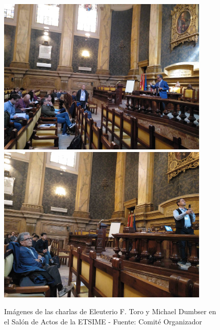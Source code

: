 \documentclass[twoside]{article}
\begin{document}
\begin{center}
\begin{figure}
	\centering
		\includegraphics[width=0.9\textwidth]{EFToro}
		\includegraphics[width=0.9\textwidth]{MDumbser}
	\label{fig:Salon2}
	\caption{Imágenes de las charlas de Eleuterio F. Toro y Michael Dumbser en el Salón de Actos de la ETSIME  - Fuente: Comité Organizador}
\end{figure}
\end{center}
%
\end{document}
